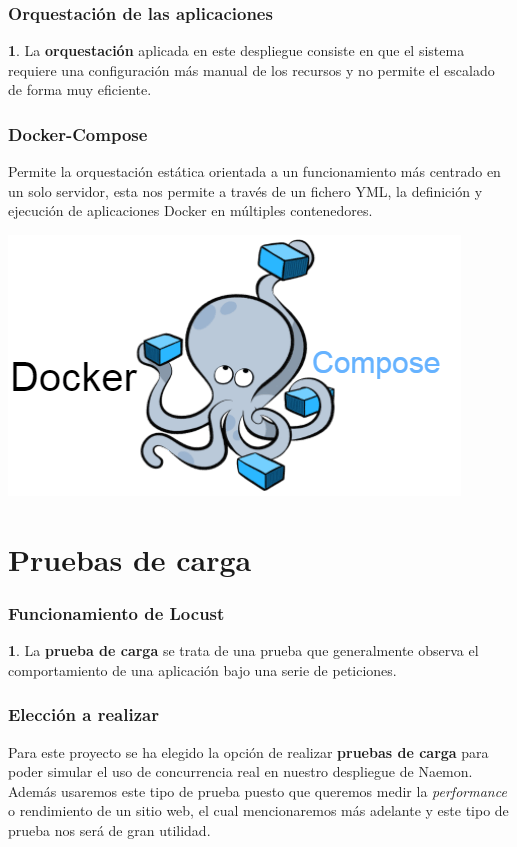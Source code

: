 \documentclass{beamer}
\theoremstyle{plain}
\theoremstyle{definition}
\newtheorem{defn}[thm]{}
\theoremstyle{plain}
\theoremstyle{definition}
\theoremstyle{remark}
\theoremstyle{definition}
\begin{document}
\begin{frame}
	\frametitle{Orquestación de las aplicaciones}
	\begin{defn}
		La \textbf{orquestación} aplicada en este despliegue consiste en que el sistema requiere una configuración más
		manual de los recursos y no permite el escalado de forma muy eficiente.
	\end{defn}
\end{frame}
\begin{frame}
	\frametitle{Docker-Compose}
	Permite la orquestación estática orientada a un funcionamiento más centrado en un solo servidor, esta nos permite a través de un fichero YML, la definición y ejecución de aplicaciones Docker en múltiples contenedores.
	
	\centering
	\includegraphics[scale=0.3]{imagenes/dockercompose.png}
\end{frame}
\section{Pruebas de carga} 
\begin{frame}
	\frametitle{Funcionamiento de Locust}
	\begin{defn}
	La \textbf{prueba de carga} se trata de una prueba que generalmente observa el comportamiento de una aplicación bajo una serie de peticiones.

\end{defn}
\end{frame}

\begin{frame}
	\frametitle{Elección a realizar}
	Para este proyecto se ha elegido la opción de realizar \textbf{pruebas de carga} para poder simular el uso de concurrencia real en nuestro despliegue de Naemon.
	Además usaremos este tipo de prueba puesto que queremos medir la \textit{performance} o rendimiento de un sitio web, el cual mencionaremos más adelante y 	este tipo de prueba nos será de gran utilidad.
\end{frame}
\end{document}
